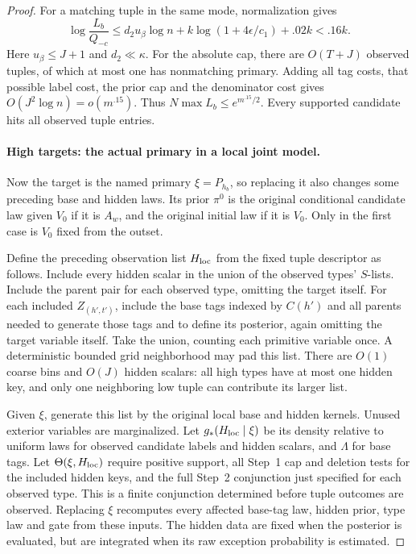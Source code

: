 \begin{proof}
For a matching tuple in the same mode, normalization gives
\[
 \log\frac{L_b}{Q_{-c}}
 \le d_2u_\beta\log n+k\log(1+4\epsilon/c_1)+.02k<.16k.
\]
Here \(u_\beta\le J+1\) and \(d_2\ll\kappa\).
For the absolute cap, there are \(O(T+J)\) observed tuples, of which
at most one has nonmatching primary. Adding all tag costs, that possible
label cost, the prior cap and the denominator cost gives
\(O(J^2\log n)=o(m^{.15})\). Thus
\(N\max L_b\le e^{m^{.15}/2}\). Every supported candidate hits all
observed tuple entries.

\paragraph{High targets: the actual primary in a local joint model.}
Now the target is the named primary \(\xi=P_{h_b}\), so replacing it
also changes some preceding base and hidden laws. Its prior \(\pi^0\)
is the original conditional candidate law given \(V_0\) if it is
\(A_w\), and the original initial law if it is \(V_0\).
Only in the first case is \(V_0\) fixed from the outset.

Define the preceding observation list \(H_{\rm loc}\) from the fixed
tuple descriptor as follows. Include every hidden scalar in the union of
the observed types' \(S\)-lists. Include the parent pair for each
observed type, omitting the target itself. For each included
\(Z_{(h',t')}\), include the base tags indexed by \(C(h')\) and all
parents needed to generate those tags and to define its posterior,
again omitting the target variable itself.
Take the union, counting each primitive variable once. A deterministic
bounded grid neighborhood may pad this list. There are \(O(1)\) coarse
bins and \(O(J)\) hidden scalars: all high types have at most one hidden
key, and only one neighboring low tuple can contribute its larger list.

Given \(\xi\), generate this list by the original local base and
hidden kernels. Unused exterior variables are marginalized. Let
\(g_*(H_{\rm loc}\mid\xi)\) be its density relative to uniform laws
for observed candidate labels and hidden scalars, and \(\Lambda\) for
base tags. Let \(\Theta(\xi,H_{\rm loc})\) require positive support,
all Step~1 cap and deletion tests for the included hidden keys, and
the full Step~2 conjunction just specified for each observed type. This is a finite
conjunction determined before tuple outcomes are observed.
Replacing \(\xi\) recomputes every affected base-tag law, hidden prior,
type law and gate from these inputs. The hidden data are fixed when the
posterior is evaluated, but are integrated when its raw exception
probability is estimated.


\end{proof}
